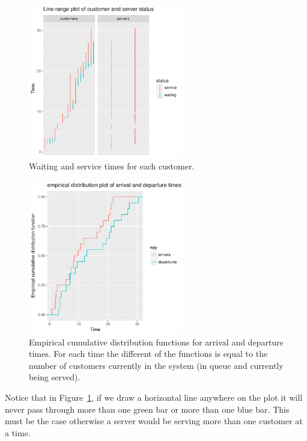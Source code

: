 \documentclass[article]{jss}
\begin{document}
\begin{figure}[!htb]
\centering
\includegraphics[width = 0.6\textwidth]{figures/customers_081.pdf}
\caption{Waiting and service times for each customer. }
\label{fig:customers}
\end{figure}

\begin{figure}[!htb]
\centering
\includegraphics[width = 0.6\textwidth]{figures/ecdf_081.pdf}
\caption{Empirical cumulative distribution functions for arrival and departure times. For each time the different of the functions is equal to the number of customers currently in the system (in queue and currently being served).}
\label{fig:ecdf}
\end{figure}

Notice that in Figure~\ref{fig:customers}, if we draw a horizontal line anywhere on the plot it will never pass through more than one green bar or more than one blue bar. This must be the case otherwise a server would be serving more than one customer at a time.
\end{document}
